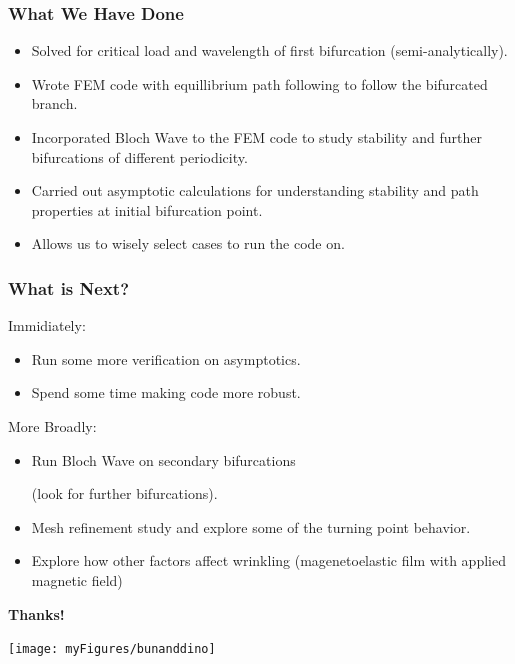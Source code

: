 \documentclass{beamer}
\begin{document}
\begin{frame}
	\frametitle{What We Have Done}
	\begin{itemize}
		\item Solved for critical load and wavelength of first bifurcation (semi-analytically).
		
		\item Wrote FEM code with equillibrium path following to follow the bifurcated branch.
		
		\item Incorporated Bloch Wave to the FEM code to study stability and further bifurcations of different periodicity.
		
		\item Carried out asymptotic calculations for understanding stability and path properties at initial bifurcation point.
		
		\item Allows us to wisely select cases to run the code on.
	\end{itemize}

\end{frame}

\begin{frame}
	\frametitle{What is Next?}
	Immidiately:
	\begin{itemize}
		\item Run some more verification on asymptotics.
		
		\item Spend some time making code more robust.

	\end{itemize}
	
	More Broadly:
	
	\begin{itemize}
		\item Run Bloch Wave on secondary bifurcations 
		
		(look for further bifurcations).
		
		\item Mesh refinement study and explore some of the 
		turning point behavior. 
		
		\item Explore how other factors affect wrinkling (magenetoelastic film with applied magnetic field)
	\end{itemize}
\end{frame}

\begin{frame}
\begin{center}
	\huge \textbf{Thanks!}
	
	\texttt{[image: myFigures/bunanddino]}
\end{center}

\end{frame}
\end{document}
